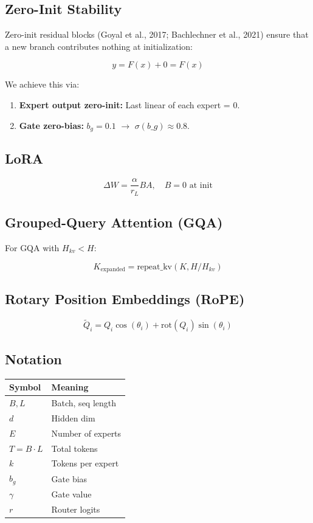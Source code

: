 \subsection{Zero-Init Stability}

Zero-init residual blocks (Goyal et al., 2017; Bachlechner et al., 2021) 
ensure that a new branch contributes nothing at initialization:

\[
y = F(x) + 0 = F(x)
\tag{3.8}
\]

We achieve this via:

\begin{enumerate}
\item \textbf{Expert output zero-init:} Last linear of each expert = 0.
\item \textbf{Gate zero-bias:} $b_g = 0.1$ $\to$ $\sigma(b\_g) \approx
  0.8$.

\end{enumerate}
\subsection{LoRA}

\[
\Delta W = \frac{\alpha}{r_L} B A, \quad B = 0 \text{ at init}
\tag{3.9}
\]

\subsection{Grouped-Query Attention (GQA)}

For GQA with $H_{kv} < H$:

\[
K_\text{expanded} = \text{repeat\_kv}(K, H / H_{kv})
\tag{3.10}
\]

\subsection{Rotary Position Embeddings (RoPE)}

\[
\tilde{Q}_i = Q_i \cos(\theta_i) + \text{rot}(Q_i) \sin(\theta_i)
\tag{3.11}
\]

\subsection{Notation}

\begin{table}[H]
\centering
\small
\begin{tabular}{ll}
\toprule
\textbf{Symbol} & \textbf{Meaning} \\
\midrule
$B, L$ & Batch, seq length \\
$d$ & Hidden dim \\
$E$ & Number of experts \\
$T = B \cdot L$ & Total tokens \\
$k$ & Tokens per expert \\
$b_g$ & Gate bias \\
$\gamma$ & Gate value \\
$r$ & Router logits \\
\bottomrule
\end{tabular}
\end{table}

